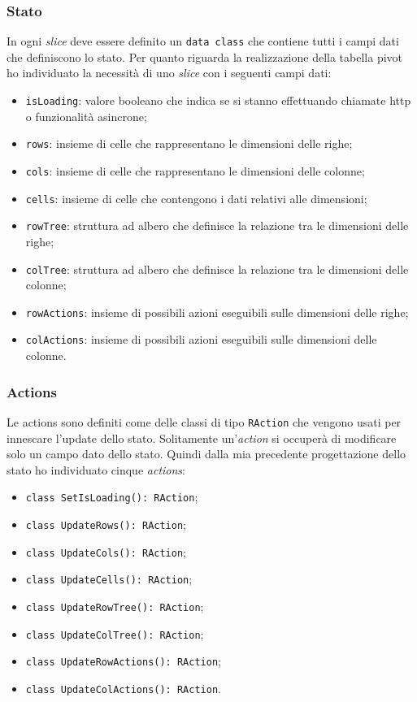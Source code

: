 \subsubsection*{Stato}
In ogni \emph{slice} deve essere definito un \verb|data class| che contiene tutti i campi dati che definiscono lo stato. Per quanto riguarda la realizzazione della tabella pivot ho individuato la necessità di uno \emph{slice} con i seguenti campi dati:
\begin{itemize}
	\item \verb|isLoading|: valore booleano che indica se si stanno effettuando chiamate http o funzionalità asincrone;
	\item \verb|rows|: insieme di celle che rappresentano le dimensioni delle righe;
	\item \verb|cols|: insieme di celle che rappresentano le dimensioni delle colonne;
	\item \verb|cells|: insieme di celle che contengono i dati relativi alle dimensioni;
	\item \verb|rowTree|: struttura ad albero che definisce la relazione tra le dimensioni delle righe;
	\item \verb|colTree|: struttura ad albero che definisce la relazione tra le dimensioni delle colonne;
	\item \verb|rowActions|: insieme di possibili azioni eseguibili sulle dimensioni delle righe;
	\item \verb|colActions|: insieme di possibili azioni eseguibili sulle dimensioni delle colonne.
\end{itemize}

\subsubsection*{Actions}
Le actions sono definiti come delle classi di tipo \verb|RAction| che vengono usati per innescare l'update dello stato. Solitamente un'\emph{action} si occuperà di modificare solo un campo dato dello stato. Quindi dalla mia precedente progettazione dello stato ho individuato cinque \emph{actions}:
\begin{itemize}
	\item \verb|class SetIsLoading(): RAction|;
	\item \verb|class UpdateRows(): RAction|;
	\item \verb|class UpdateCols(): RAction|;
	\item \verb|class UpdateCells(): RAction|;
	\item \verb|class UpdateRowTree(): RAction|;
	\item \verb|class UpdateColTree(): RAction|;
	\item \verb|class UpdateRowActions(): RAction|;
	\item \verb|class UpdateColActions(): RAction|.
\end{itemize}


